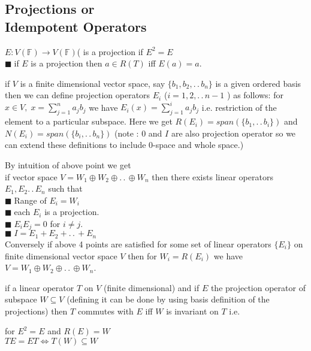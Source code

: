 \documentclass[11pt]{extarticle}
\newcommand{\F}{\mathbb{F}}
\newcommand{\ra}{\rightarrow}
\newcommand{\ck}{.\,.\,}
\newcommand{\snote}[1]{{\footnotesize(#1)}}
\newcommand{\tbx}[2][]{
	\begin{tcolorbox}[enhanced,breakable,size=small,colback=black!2!white,title={#1},arc is angular, arc=1.5mm,drop fuzzy shadow]
		#2
	\end{tcolorbox}
}
\newcommand{\yi}{\\$\blacksquare\;$}
\begin{document}
\begin{multicols}{2}
\section{Projections or \\ Idempotent Operators }
\tbx[Projections]{ $ E: V(\F)\ra V(\F) $( is a projection if $ E^2=E $ 
\yi if $ E $ is a projection then $ a\in R(T) $ iff $ E(a)=a. $  }
\tbx{ if $ V $ is a finite dimensional vector space, say $ \{b_1,b_2,\ck b_n\} $ is a given ordered basis then we can define projection operators $ E_i $ \snote{$ i=1,2,\ck n-1 $ } as follows: for $x\in V,\; x= \sum\limits_{j=1}^{n}a_jb_j $ we have 
 $ E_i(x)=\sum\limits_{j=1}^{i} a_jb_j$  i.e. restriction of the element to a particular subspace. Here we get $ R(E_i)=span(\{b_1,\ck b_i\}) $ and $ N(E_i) =span(\{b_i,\ck b_n\})$ \snote{note : $ 0 $ and $ I $ are also projection operator so we can extend these definitions to include 0-space and whole space.} }
 \tbx{ By intuition of above point we get \\
  if vector space $ V=W_1\oplus W_2 \oplus \ck \oplus W_n $ then there exists linear operators $ E_1,E_2\ck E_n $ such that
  \yi Range of $ E_i = W_i$ 
  \yi each $ E_i $ is a projection.
  \yi $ E_iE_j=0 $ for $ i\neq j. $ 
  \yi $ I=E_1+E_2+\ck +E_n $ \\
  Conversely if above 4 points are satisfied for some set of linear operators $ \{E_i\} $ on finite dimensional vector space $ V $ then for $ W_i=R(E_i) $ we have $ V= W_1\oplus W_2 \oplus \ck \oplus W_n$.}
  \tbx{ if a linear operator $ T $ on $ V $ \snote{finite dimensional} and if $ E $ the projection operator of subspace $ W\subseteq V $ \snote{defining it can be done by using basis definition of the projections}  then $ T $ commutes with $ E $ iff $ W$ is invariant on $ T $ i.e. 
  	 \begin{center}
  	 for $ E^2=E$ and  $ R(E)=W $\\
  $ TE=ET \iff T(W)\subseteq W $
  	 	\end{center} }
   	

\end{multicols}
\end{document}
